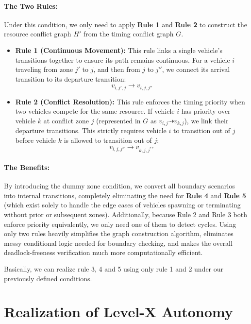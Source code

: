 \documentclass{article}
\begin{document}
\paragraph{The Two Rules:}
Under this condition, we only need to apply \textbf{Rule 1} and \textbf{Rule 2} to construct the resource conflict graph $H'$ from the timing conflict graph $G$.
\begin{itemize}
    \item \textbf{Rule 1 (Continuous Movement):} This rule links a single vehicle's transitions together to ensure its path remains continuous. For a vehicle $i$ traveling from zone $j'$ to $j$, and then from $j$ to $j''$, we connect its arrival transition to its departure transition:
    \[
    v_{i, j', j} \rightarrow v_{i, j, j''}
    \]
    
    \item \textbf{Rule 2 (Conflict Resolution):} This rule enforces the timing priority when two vehicles compete for the same resource. If vehicle $i$ has priority over vehicle $k$ at conflict zone $j$ (represented in $G$ as $v_{i, j} \dashrightarrow v_{k, j}$), we link their departure transitions. This strictly requires vehicle $i$ to transition out of $j$ before vehicle $k$ is allowed to transition out of $j$:
    \[
    v_{i, j, j''} \rightarrow v_{k, j, j^{**}}
    \]
\end{itemize}

\paragraph{The Benefits:}
By introducing the dummy zone condition, we convert all boundary scenarios into internal transitions, completely eliminating the need for \textbf{Rule 4} and \textbf{Rule 5} (which exist solely to handle the edge cases of vehicles spawning or terminating without prior or subsequent zones). Additionally, because Rule 2 and Rule 3 both enforce priority equivalently, we only need one of them to detect cycles. Using only two rules heavily simplifies the graph construction algorithm, eliminates messy conditional logic needed for boundary checking, and makes the overall deadlock-freeness verification much more computationally efficient.

Basically, we can realize rule 3, 4 and 5 using only rule 1 and 2 under our previously defined conditions.





\newpage
\section{Realization of Level-X Autonomy}
\end{document}
